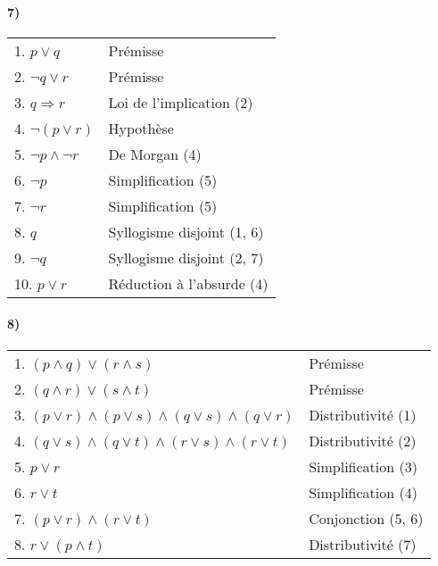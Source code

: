     \paragraph{7)}
    \begin{center}
    \begin{tabular}{|l|l|}
    \hline
    1. $p \lor q$ & Prémisse \\
    2. $\lnot q \lor r$ & Prémisse \\
    3. $q \Rightarrow r$ & Loi de l'implication (2) \\
    \hspace{0.5cm} 4. $\lnot(p \lor r)$ & Hypothèse \\
    \hspace{0.5cm} 5. $\lnot p \land \lnot r$ & De Morgan (4) \\ 
    \hspace{0.5cm} 6. $\lnot p$ & Simplification (5) \\
    \hspace{0.5cm} 7. $\lnot r$ & Simplification (5) \\
    \hspace{0.5cm} 8. $q$ & Syllogisme disjoint (1, 6) \\
    \hspace{0.5cm} 9. $\lnot q$ & Syllogisme disjoint (2, 7) \\
    10. $p \lor r$ & Réduction à l'absurde (4)\\
    \hline
    \end{tabular}
    \end{center}
    
    \paragraph{8)}
    \begin{center}
    \begin{tabular}{|l|l|}
    \hline
    1. $(p \land q) \lor (r \land s)$ & Prémisse \\
    2. $(q \land r) \lor (s \land t)$ & Prémisse \\
    3. $(p \lor r) \land (p \lor s) \land (q \lor s) \land (q \lor r)$ & Distributivité (1) \\
    4. $(q \lor s) \land (q \lor t) \land (r \lor s) \land (r \lor t)$ & Distributivité (2) \\
    5. $p \lor r$ & Simplification (3) \\ 
    6. $r \lor t$ & Simplification (4) \\ 
    7. $(p \lor r) \land (r \lor t)$ & Conjonction (5, 6) \\ 
    8. $r \lor (p \land t)$ & Distributivité (7) \\ 
    \hline
    \end{tabular}
    \end{center}


